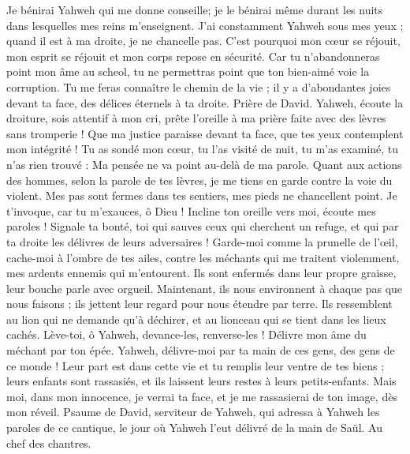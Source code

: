 \begin{multicols}{2}
Je bénirai Yahweh qui me donne conseille; je le bénirai même durant les nuits dans lesquelles mes reins m'enseignent.
J'ai constamment Yahweh sous mes yeux ; quand il est à ma droite, je ne chancelle pas.
C'est pourquoi mon cœur se réjouit, mon esprit se réjouit et mon corps repose en sécurité.
Car tu n'abandonneras point mon âme au scheol, tu ne permettras point que ton bien-aimé voie la corruption.
Tu me feras connaître le chemin de la vie ; il y a d'abondantes joies devant ta face, des délices éternels à ta droite.
\VerseOne{}Prière de David. Yahweh, écoute la droiture, sois attentif à mon cri, prête l'oreille à ma prière faite avec des lèvres sans tromperie !
Que ma justice paraisse devant ta face, que tes yeux contemplent mon intégrité !
Tu as sondé mon cœur, tu l'as visité de nuit, tu m'as examiné, tu n'as rien trouvé : Ma pensée ne va point au-delà de ma parole.
Quant aux actions des hommes, selon la parole de tes lèvres, je me tiens en garde contre la voie du violent.
Mes pas sont fermes dans tes sentiers, mes pieds ne chancellent point.
Je t'invoque, car tu m'exauces, ô Dieu ! Incline ton oreille vers moi, écoute mes paroles !
Signale ta bonté, toi qui sauves ceux qui cherchent un refuge, et qui par ta droite les délivres de leurs adversaires !
Garde-moi comme la prunelle de l'œil, cache-moi à l'ombre de tes ailes,
contre les méchants qui me traitent violemment, mes ardents ennemis qui m'entourent.
Ils sont enfermés dans leur propre graisse, leur bouche parle avec orgueil.
Maintenant, ils nous environnent à chaque pas que nous faisons ; ils jettent leur regard pour nous étendre par terre.
Ils ressemblent au lion qui ne demande qu'à déchirer, et au lionceau qui se tient dans les lieux cachés.
Lève-toi, ô Yahweh, devance-les, renverse-les ! Délivre mon âme du méchant par ton épée.
Yahweh, délivre-moi par ta main de ces gens, des gens de ce monde ! Leur part est dans cette vie et tu remplis leur ventre de tes biens ; leurs enfants sont rassasiés, et ils laissent leurs restes à leurs petits-enfants.
Mais moi, dans mon innocence, je verrai ta face, et je me rassasierai de ton image, dès mon réveil.
\VerseOne{}Psaume de David, serviteur de Yahweh, qui adressa à Yahweh les paroles de ce cantique, le jour où Yahweh l'eut délivré de la main de Saül. Au chef des chantres.

\end{multicols}
